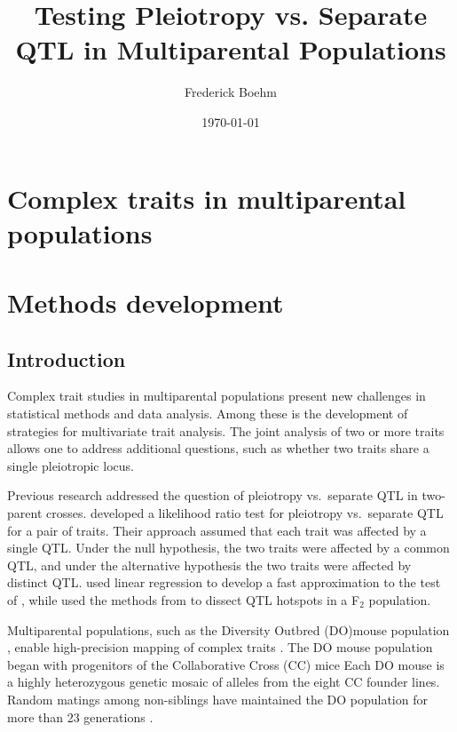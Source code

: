 \documentclass[oneside]{book}
\title{Testing Pleiotropy vs. Separate QTL in Multiparental Populations}
\author{Frederick Boehm}
\date{\today}
\begin{document}
\frontmatter %
\doublespacing
\maketitle
\tableofcontents
\listoffigures
\listoftables
\mainmatter %

\chapter{Complex traits in multiparental populations}


\chapter{Methods development}

\section{Introduction}

Complex trait studies in multiparental populations present new
challenges in statistical methods and data analysis. Among these is
the development of strategies for multivariate trait analysis. The
joint analysis of two or more traits allows one to address additional
questions, such as whether two traits share a single pleiotropic
locus.




Previous research addressed the question of pleiotropy vs.\ separate
QTL in two-parent crosses.
\citet{jiang1995multiple} developed a likelihood
ratio test for pleiotropy vs.\ separate QTL for a pair of traits.
Their approach assumed that each trait was affected by a single QTL.
Under the null hypothesis, the two traits were affected by a common
QTL, and under the alternative hypothesis the two traits were affected
by distinct QTL.
\citet{knott2000multitrait} used linear regression to develop a fast
approximation to the test of \citet{jiang1995multiple}, while
\citet{tian2016dissection} used the methods from
\citet{knott2000multitrait} to dissect QTL hotspots in a F$_2$
population.




Multiparental populations, such
as the Diversity Outbred (DO)mouse population \citep{churchill2012diversity}, enable high-precision
mapping of complex traits \citep{de2014genetics}. The DO
mouse population began with progenitors of the Collaborative
Cross (CC) mice \citep{churchill2004collaborative}
Each DO mouse is a highly heterozygous genetic mosaic
of alleles from the eight CC founder lines. Random
matings among non-siblings have maintained the DO
population for more than 23 generations \citep{chesler2016diversity}.
\end{document}

